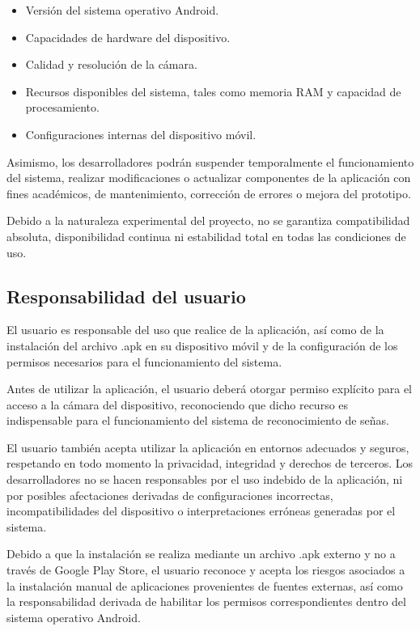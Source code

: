	\begin{itemize}
		\item Versión del sistema operativo Android.
		
		\item Capacidades de hardware del dispositivo.
		
		\item Calidad y resolución de la cámara.
		
		\item Recursos disponibles del sistema, tales como memoria RAM y capacidad de procesamiento.
		
		\item Configuraciones internas del dispositivo móvil.
	\end{itemize}
	
	Asimismo, los desarrolladores podrán suspender temporalmente el funcionamiento del sistema, realizar modificaciones o actualizar componentes de la aplicación con fines académicos, de mantenimiento, corrección de errores o mejora del prototipo.
	
	Debido a la naturaleza experimental del proyecto, no se garantiza compatibilidad absoluta, disponibilidad continua ni estabilidad total en todas las condiciones de uso.
	
	\subsection{Responsabilidad del usuario}
	
	El usuario es responsable del uso que realice de la aplicación, así como de la instalación del archivo .apk en su dispositivo móvil y de la configuración de los permisos necesarios para el funcionamiento del sistema.
	
	Antes de utilizar la aplicación, el usuario deberá otorgar permiso explícito para el acceso a la cámara del dispositivo, reconociendo que dicho recurso es indispensable para el funcionamiento del sistema de reconocimiento de señas.
	
	El usuario también acepta utilizar la aplicación en entornos adecuados y seguros, respetando en todo momento la privacidad, integridad y derechos de terceros. Los desarrolladores no se hacen responsables por el uso indebido de la aplicación, ni por posibles afectaciones derivadas de configuraciones incorrectas, incompatibilidades del dispositivo o interpretaciones erróneas generadas por el sistema.
	
	Debido a que la instalación se realiza mediante un archivo .apk externo y no a través de Google Play Store, el usuario reconoce y acepta los riesgos asociados a la instalación manual de aplicaciones provenientes de fuentes externas, así como la responsabilidad derivada de habilitar los permisos correspondientes dentro del sistema operativo Android.
	
